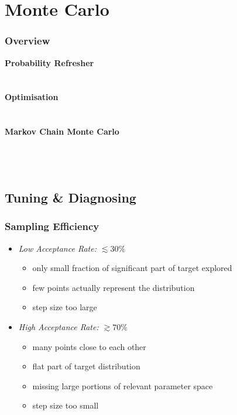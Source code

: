 	\section{Monte Carlo}

	\begin{frame}
		\frametitle{Overview}
		\bfseries{Probability Refresher}\\[1.5pt]
		\hspace*{3ex}\\
		\hspace*{3ex}\\[3.0pt]
		\bfseries{Optimisation}\\[1.5pt]
		\hspace*{3ex}\\
		\hspace*{3ex}\\[3.0pt]
		\bfseries{Markov Chain Monte Carlo}\\[1.5pt]
		\hspace*{3ex}\\
		\hspace*{3ex}\\
		\hspace*{3ex}\\[3.0pt]
	\end{frame}

	\subsection{Tuning \& Diagnosing}

	\begin{frame}
		\frametitle{Sampling Efficiency}
		\begin{itemize}
			\item<2-> \itshape{Low Acceptance Rate:} $\lesssim30\%$
			\begin{itemize}
				\item<3-> only small fraction of significant part of target explored
				\item<4-> few points actually represent the distribution
				\item<5-> step size too large
			\end{itemize}
			\item<6-> \itshape{High Acceptance Rate:} $\gtrsim70\%$
			\begin{itemize}
				\item<7-> many points close to each other
				\item<8-> flat part of target distribution
				\item<9-> missing large portions of relevant parameter space
				\item<10-> step size too small
			\end{itemize}
		\end{itemize}
	\end{frame}

